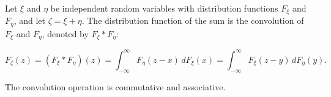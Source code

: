 Let $\xi$ and $\eta$ be independent random variables with distribution functions $F_\xi$ and $F_\eta$, and let $\zeta = \xi + \eta$. The distribution function of the sum is the convolution of $F_\xi$ and $F_\eta$, denoted by $F_\xi * F_\eta$:

$$F_\zeta(z) = (F_\xi * F_\eta)(z) = \int_{-\infty}^{\infty} F_\eta(z - x) \, dF_\xi(x) = \int_{-\infty}^{\infty} F_\xi(z - y) \, dF_\eta(y).$$

The convolution operation is commutative and associative.
